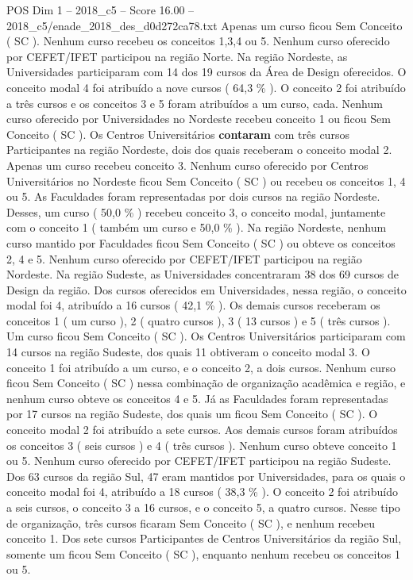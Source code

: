 \begin{textsample}{POS Dim 1 – 2018\_c5 – Score 16.00 – 2018\_c5/enade\_2018\_des\_d0d272ca78.txt}
Apenas um curso ficou Sem Conceito ( SC ).
Nenhum curso recebeu os conceitos 1,3,4 ou 5.
Nenhum curso oferecido por CEFET/IFET participou na região Norte.
Na região Nordeste, as Universidades participaram com 14 dos 19 cursos da Área de Design oferecidos.
O conceito modal 4 foi atribuído a nove cursos ( 64,3 \% ).
O conceito 2 foi atribuído a três cursos e os conceitos 3 e 5 foram atribuídos a um curso, cada.
Nenhum curso oferecido por Universidades no Nordeste recebeu conceito 1 ou ficou Sem Conceito ( SC ).
Os Centros Universitários \textbf{contaram} com três cursos Participantes na região Nordeste, dois dos quais receberam o conceito modal 2.
Apenas um curso recebeu conceito 3.
Nenhum curso oferecido por Centros Universitários no Nordeste ficou Sem Conceito ( SC ) ou recebeu os conceitos 1, 4 ou 5.
As Faculdades foram representadas por dois cursos na região Nordeste.
Desses, um curso ( 50,0 \% ) recebeu conceito 3, o conceito modal, juntamente com o conceito 1 ( também um curso e 50,0 \% ).
Na região Nordeste, nenhum curso mantido por Faculdades ficou Sem Conceito ( SC ) ou obteve os conceitos 2, 4 e 5.
Nenhum curso oferecido por CEFET/IFET participou na região Nordeste.
Na região Sudeste, as Universidades concentraram 38 dos 69 cursos de Design da região.
Dos cursos oferecidos em Universidades, nessa região, o conceito modal foi 4, atribuído a 16 cursos ( 42,1 \% ).
Os demais cursos receberam os conceitos 1 ( um curso ), 2 ( quatro cursos ), 3 ( 13 cursos ) e 5 ( três cursos ).
Um curso ficou Sem Conceito ( SC ).
Os Centros Universitários participaram com 14 cursos na região Sudeste, dos quais 11 obtiveram o conceito modal 3.
O conceito 1 foi atribuído a um curso, e o conceito 2, a dois cursos.
Nenhum curso ficou Sem Conceito ( SC ) nessa combinação de organização acadêmica e região, e nenhum curso obteve os conceitos 4 e 5.
Já as Faculdades foram representadas por 17 cursos na região Sudeste, dos quais um ficou Sem Conceito ( SC ).
O conceito modal 2 foi atribuído a sete cursos.
Aos demais cursos foram atribuídos os conceitos 3 ( seis cursos ) e 4 ( três cursos ).
Nenhum curso obteve conceito 1 ou 5.
Nenhum curso oferecido por CEFET/IFET participou na região Sudeste.
Dos 63 cursos da região Sul, 47 eram mantidos por Universidades, para os quais o conceito modal foi 4, atribuído a 18 cursos ( 38,3 \% ).
O conceito 2 foi atribuído a seis cursos, o conceito 3 a 16 cursos, e o conceito 5, a quatro cursos.
Nesse tipo de organização, três cursos ficaram Sem Conceito ( SC ), e nenhum recebeu conceito 1.
Dos sete cursos Participantes de Centros Universitários da região Sul, somente um ficou Sem Conceito ( SC ), enquanto nenhum recebeu os conceitos 1 ou 5.

\end{textsample}
